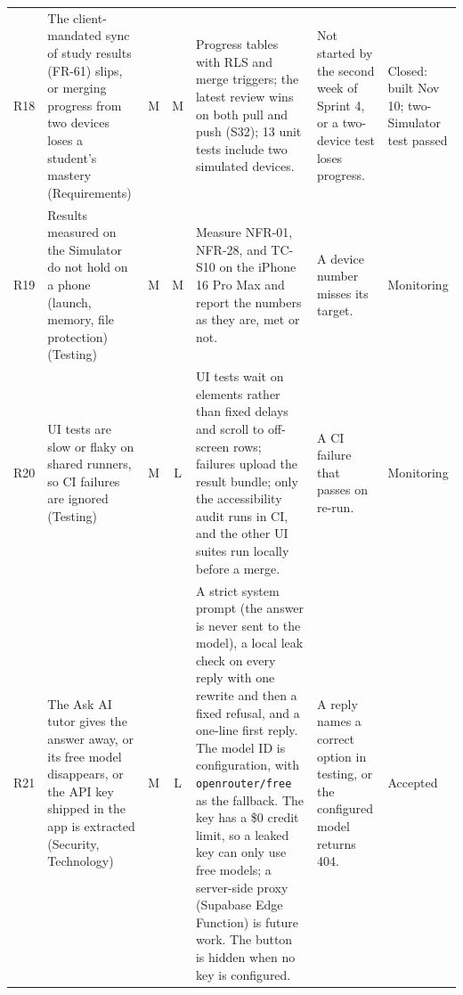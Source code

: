 \documentclass[12pt,letterpaper]{article}
\begin{document}
\begin{xltabular}{\textwidth}{@{}l L{3.0cm} c c Y L{2.9cm} L{1.7cm}@{}}
R18 & The client-mandated sync of study results (FR-61) slips, or merging progress from two devices loses a student's mastery (Requirements) & M & M & Progress tables with RLS and merge triggers; the latest review wins on both pull and push (S32); 13 unit tests include two simulated devices. & Not started by the second week of Sprint 4, or a two-device test loses progress. & Closed: built Nov 10; two-Simulator test passed \\
R19 & Results measured on the Simulator do not hold on a phone (launch, memory, file protection) (Testing) & M & M & Measure NFR-01, NFR-28, and TC-S10 on the iPhone 16 Pro Max and report the numbers as they are, met or not. & A device number misses its target. & Monitoring \\
R20 & UI tests are slow or flaky on shared runners, so CI failures are ignored (Testing) & M & L & UI tests wait on elements rather than fixed delays and scroll to off-screen rows; failures upload the result bundle; only the accessibility audit runs in CI, and the other UI suites run locally before a merge. & A CI failure that passes on re-run. & Monitoring \\
R21 & The Ask AI tutor gives the answer away, or its free model disappears, or the API key shipped in the app is extracted (Security, Technology) & M & L & A strict system prompt (the answer is never sent to the model), a local leak check on every reply with one rewrite and then a fixed refusal, and a one-line first reply. The model ID is configuration, with \texttt{openrouter/free} as the fallback. The key has a \$0 credit limit, so a leaked key can only use free models; a server-side proxy (Supabase Edge Function) is future work. The button is hidden when no key is configured. & A reply names a correct option in testing, or the configured model returns 404. & Accepted \\
\end{xltabular}
\end{document}
